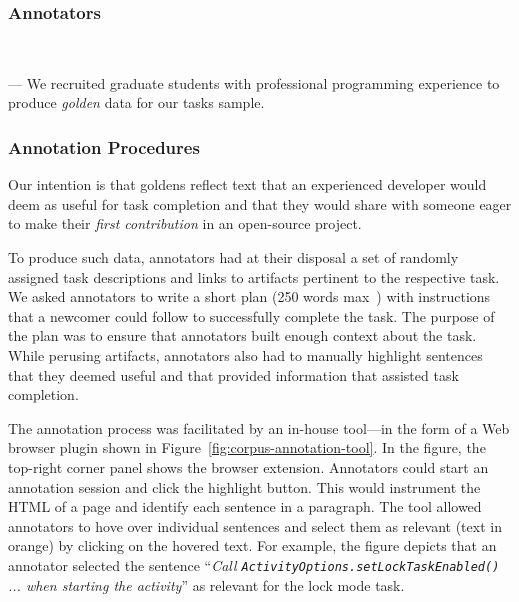 




\subsubsection{Annotators}
\textcolor{white}{force ident} %

--- We recruited  graduate students with professional programming experience to produce \textit{golden} data for our tasks sample. \vspace{3mm}


\subsubsection{Annotation Procedures}


Our intention is that goldens reflect text that an experienced developer would deem as useful for task completion and that they would share with someone eager to make their \textit{first contribution} in an open-source project.



To produce such data, annotators had at their disposal a set of randomly assigned task descriptions and links to artifacts pertinent to the respective task. We asked annotators to write a short plan (250 words max~\cite{Rastkar2010}) with instructions that a newcomer could follow to successfully complete the task. 
The purpose of the plan was to ensure that annotators built enough context about the task.
While perusing artifacts, annotators also had to manually highlight sentences that they deemed useful and that provided information that assisted task completion. 


The annotation process was facilitated by an in-house tool---in the form of a Web browser plugin shown in Figure~\ref{fig:corpus-annotation-tool}. In the figure, the top-right corner panel shows the browser extension. Annotators could start an annotation session and click the highlight button.
This would instrument the HTML of a page and identify each sentence in a paragraph. The tool allowed annotators to hove over individual sentences and select them as relevant (text in orange) by clicking on the hovered text. For example, the figure depicts that an annotator selected  the sentence
``\textit{Call {\small \texttt{ActivityOptions.setLockTaskEnabled()}} ... when starting the activity}'' as relevant for the lock mode task.


